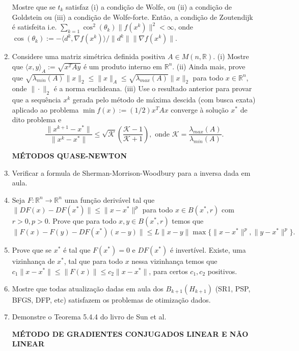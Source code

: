 \documentclass[a4paper,latin]{article}
\begin{document}
\begin{enumerate}
    Mostre que se  
    $t_{k}$ satisfaz (i) a condição de Wolfe, ou (ii) a condição de Goldstein ou (iii) a condição de Wolfe-forte. Então, a condição de Zoutendijk
    é satisfeita i.e. 
    $\sum_{k=1} \cos^{2}(\theta_{k})\|f(x^{k})\|^{2}< \infty$, 
    onde 
    $\cos(\theta_{k}):=-\langle d^{k}, \nabla f(x^k)\rangle /\|d^k\|\|\nabla f(x^k)\|$.
    \item Considere uma matriz simétrica definida positiva $A \in M(n,\mathbb{R})$. (i) Mostre que 
    $\langle x, y \rangle_{A} :=\sqrt{x^{T}Ay}$ é um produto interno em $\mathbb{R}^{n}$.
    (ii) Ainda mais, prove que 
    $\sqrt{\lambda_{min}(A)}\|x\|_{2}\leq \|x\|_{A} \leq \sqrt{\lambda_{max}(A)}\|x\|_{2}$ para todo $x \in \mathbb{R}^{n}$, 
    onde $\|\cdot\|_{2}$ é a norma euclideana.
    (iii) Use o resultado anterior para provar que a sequência $x^{k}$ gerada pelo método de máxima descida (com busca exata)  
    aplicado ao problema 
    $\min f(x):=(1/2)x^{T}Ax$ converge à solução $x^*$ de dito problema e 
    $$ \frac{\|x^{k+1}-x^*\|}{\|x^k-x^*\|}\leq \sqrt{\mathcal{K}} \left(\frac{\mathcal{K}-1}{\mathcal{K}+1}\right), \text{ onde } \mathcal{K}=\frac{\lambda_{max}(A)}{\lambda_{min}(A)}. $$ 
    
    {\bf MÉTODOS QUASE-NEWTON}
    
    \item Verificar a formula de Sherman-Morrison-Woodbury para a inversa dada em aula.
    \item Seja $F:\mathbb{R}^{n}\rightarrow \mathbb{R}^{n}$
    uma função derivável tal que 
    $\|DF(x)-DF(x^*)\|\leq 
    \|x-x^*\|^{p}$ para todo 
    $x \in B(x^*, r)$ com $r>0, p>0$.
    Prove que para todo $x, y \in B(x^*, r)$ 
    temos que 
    $$
    \|F(x)-F(y)-DF(x^*)(x-y)\|\leq L
    \|x-y\|\max \{\|x-x^*\|^p, 
      \|y-x^*\|^p\}.$$
    \item  Prove que se $x^*$ é tal que
    $F(x^*)=0$ e 
    $DF(x^*)$ é invertível. 
    Existe, uma vizinhança de $x^*$, tal que 
    para todo $x$ nessa vizinhança
    temos que $c_1\|x-x^*\|
    \leq \|F(x)\|
    \leq
    c_2\|x-x^*\|$, 
    para certos $c_1, c_2$ positivos.
    \item Mostre que todas atualização dadas em aula dos $B_{k+1} (H_{k+1})$
    (SR1, PSP, BFGS, DFP, etc)
    satisfazem os problemas de otimização dados.
    \item  Demonstre o Teorema 5.4.4 do livro de Sun et al.
        
    {\bf MÉTODO DE GRADIENTES CONJUGADOS LINEAR E NÃO LINEAR}
    

\end{enumerate}
\end{document}
